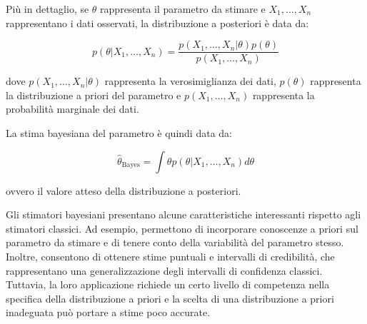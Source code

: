 Più in dettaglio, se $\theta$ rappresenta il parametro da stimare e $X_1,\ldots,X_n$ rappresentano i dati osservati, la distribuzione a posteriori è data da:

$$p(\theta | X_1, \ldots, X_n) = \frac{p(X_1, \ldots, X_n | \theta) p(\theta)}{p(X_1, \ldots, X_n)}$$

dove $p(X_1, \ldots, X_n | \theta)$ rappresenta la verosimiglianza dei dati, $p(\theta)$ rappresenta la distribuzione a priori del parametro e $p(X_1, \ldots, X_n)$ rappresenta la probabilità marginale dei dati.

La stima bayesiana del parametro è quindi data da:

$$\hat{\theta}_{\text{Bayes}} = \int \theta p(\theta | X_1, \ldots, X_n) d\theta$$

ovvero il valore atteso della distribuzione a posteriori.

Gli stimatori bayesiani presentano alcune caratteristiche interessanti rispetto agli stimatori classici. Ad esempio, permettono di incorporare conoscenze a priori sul parametro da stimare e di tenere conto della variabilità del parametro stesso. Inoltre, consentono di ottenere stime puntuali e intervalli di credibilità, che rappresentano una generalizzazione degli intervalli di confidenza classici. Tuttavia, la loro applicazione richiede un certo livello di competenza nella specifica della distribuzione a priori e la scelta di una distribuzione a priori inadeguata può portare a stime poco accurate.


